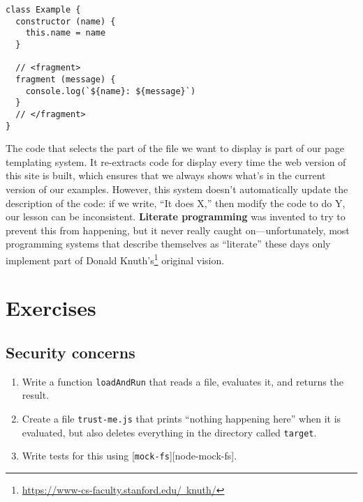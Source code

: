 \documentclass[krantzl]{krantz}
\newcommand{\glossref}[1]{\textbf{#1}}
\newcommand{\hreffoot}[2]{{#1}\footnote{\href{#2}{#2}}}
\begin{document}
\begin{lstlisting}[frame=tblr]
class Example {
  constructor (name) {
    this.name = name
  }

  // <fragment>
  fragment (message) {
    console.log(`${name}: ${message}`)
  }
  // </fragment>
}
\end{lstlisting}


The code that selects the part of the file we want to display
is part of our page templating system.
It re-extracts code for display every time the web version of this site is built,
which ensures that we always shows what’s in the current version of our examples.
However,
this system doesn’t automatically update the description of the code:
if we write, “It does X,”
then modify the code to do Y,
our lesson can be inconsistent.
\glossref{Literate programming} was invented
to try to prevent this from happening,
but it never really caught on—unfortunately,
most programming systems that describe themselves as “literate” these days
only implement part of \hreffoot{Donald Knuth’s}{https://www-cs-faculty.stanford.edu/~knuth/} original vision.

\section{Exercises}\label{file-interpolator-exercises}

\subsection*{Security concerns}

\begin{enumerate}

\item 

Write a function \texttt{loadAndRun} that reads a file, evaluates it, and returns the result.



\item 

Create a file \texttt{trust-me.js} that prints “nothing happening here” when it is evaluated,
    but also deletes everything in the directory called \texttt{target}.



\item 

Write tests for this using [\texttt{mock-fs}][node-mock-fs].



\end{enumerate}
\end{document}
